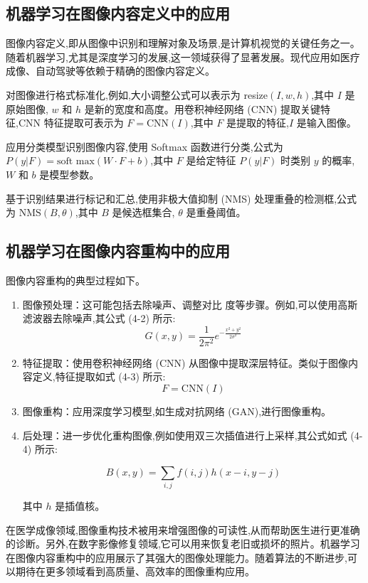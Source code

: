 \documentclass[a4paper]{article}
\theoremstyle{definition}
\theoremstyle{plain}
\theoremstyle{remark}
\begin{document}
\subsection{机器学习在图像内容定义中的应用}
图像内容定义,即从图像中识别和理解对象及场景,是计算机视觉的关键任务之一。随着机器学习,尤其是深度学习的发展,这一领域获得了显著发展。现代应用如医疗成像、自动驾驶等依赖于精确的图像内容定义。

对图像进行格式标准化,例如,大小调整公式可以表示为 resize$(I,w,h)$,其中 $I$ 是原始图像, $w$ 和 $h$ 是新的宽度和高度。用卷积神经网络 (CNN) 提取关键特征,CNN 特征提取可表示为 $F=\mathrm{CNN}(I)$,其中 $F$ 是提取的特征,$I$ 是输入图像。

应用分类模型识别图像内容,使用 Softmax 函数进行分类,公式为 $P(y|F)=\text{soft max}(W \cdot F+b)$,其中 $F$ 是给定特征 $P(y|F)$ 时类别 $y$ 的概率, $W$ 和 $b$ 是模型参数。

基于识别结果进行标记和汇总,使用非极大值抑制 (NMS) 处理重叠的检测框,公式为 $\mathrm{NMS}(B,\theta)$,其中 $B$ 是候选框集合, $\theta$ 是重叠阈值。
\subsection{机器学习在图像内容重构中的应用}
图像内容重构的典型过程如下。
\begin{enumerate}
	\item 图像预处理：这可能包括去除噪声、调整对比
	度等步骤。例如,可以使用高斯滤波器去除噪声,其公式 (4-2) 所示:
	\begin{equation}
	G(x, y) = \frac{1}{2\pi^2} e^{-\frac{x^2 + y^2}{2\sigma^2}}
	\end{equation}
	\item 特征提取：使用卷积神经网络 (CNN) 从图像中提取深层特征。类似于图像内容定义,特征提取如式 (4-3) 所示:
	\begin{equation}
	F = \mathrm{CNN}(I)
	\end{equation}
	\item 图像重构：应用深度学习模型,如生成对抗网络 (GAN),进行图像重构。
	\item 后处理：进一步优化重构图像,例如使用双三次插值进行上采样,其公式如式 (4-4) 所示:

	\begin{equation}
	B(x, y) = \sum_{i, j} f(i, j)h(x - i, y - j)
	\end{equation}
	
	其中 $h$ 是插值核。
\end{enumerate}

在医学成像领域,图像重构技术被用来增强图像的可读性,从而帮助医生进行更准确的诊断。另外,在数字影像修复领域,它可以用来恢复老旧或损坏的照片。机器学习在图像内容重构中的应用展示了其强大的图像处理能力。随着算法的不断进步,可以期待在更多领域看到高质量、高效率的图像重构应用。
\end{document}
